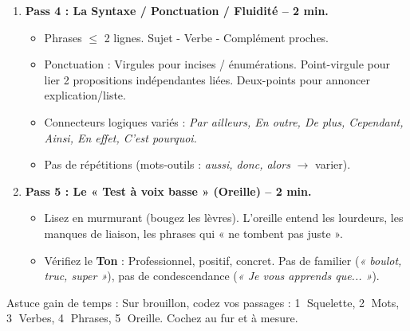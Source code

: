 \documentclass[11pt]{article}
\newcommand{\cle}[1]{{\popxbold\color{popdark}#1}}
\begin{document}
\begin{methode}
\begin{enumerate}
\begin{itemize}
\item [$\square$] \textbf{Accords GN :} \textit{« Mes compétences techniques »} (pluriel), \textit{« Une expérience significative »} (singulier).
\end{itemize}
\item \textbf{Pass 4 : La Syntaxe / Ponctuation / Fluidité -- 2 min.}
\begin{itemize}
\item [$\square$] Phrases $\le$ 2 lignes. Sujet - Verbe - Complément proches.
\item [$\square$] Ponctuation : Virgules pour incises / énumérations. Point-virgule pour lier 2 propositions indépendantes liées. Deux-points pour annoncer explication/liste.
\item [$\square$] Connecteurs logiques variés : \textit{Par ailleurs, En outre, De plus, Cependant, Ainsi, En effet, C'est pourquoi.}
\item [$\square$] Pas de répétitions (mots-outils : \textit{aussi, donc, alors} $\rightarrow$ varier).
\end{itemize}
\item \textbf{Pass 5 : Le « Test à voix basse » (Oreille) -- 2 min.}
\begin{itemize}
\item [$\square$] Lisez en murmurant (bougez les lèvres). L'oreille entend les lourdeurs, les manques de liaison, les phrases qui « ne tombent pas juste ».
\item [$\square$] Vérifiez le \textbf{Ton} : Professionnel, positif, concret. Pas de familier (\textit{« boulot, truc, super »}), pas de condescendance (\textit{« Je vous apprends que... »}).
\end{itemize}
\end{enumerate}
\cle{Astuce gain de temps :} Sur brouillon, codez vos passages : \textcircled{1} Squelette, \textcircled{2} Mots, \textcircled{3} Verbes, \textcircled{4} Phrases, \textcircled{5} Oreille. Cochez au fur et à mesure.
\end{methode}
\end{document}
